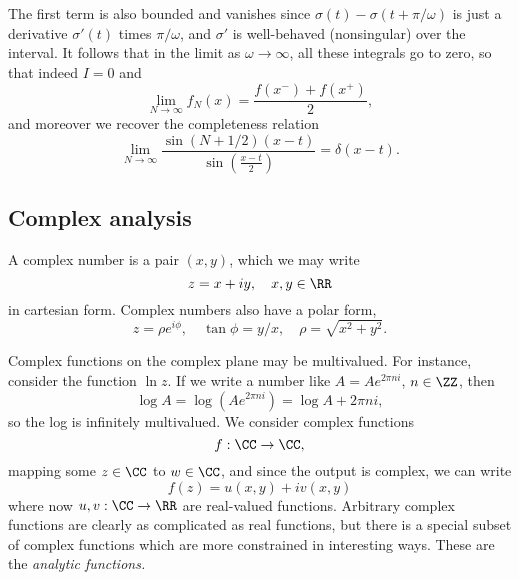 The first term is also bounded and vanishes since $\sigma(t) -\sigma(t+\pi/\omega)$ is just a derivative $\sigma'(t)$ times $\pi/\omega$, and $\sigma'$ is well-behaved (nonsingular) over the interval. It follows that in the limit as $\omega \to \infty$, all these integrals go to zero, so that indeed $I=0$ and
\begin{equation}
    \lim_{N\to \infty} f_N(x) = \frac{f(x^-) + f(x^+)}{2},
\end{equation}
and moreover we recover the completeness relation
\begin{equation}
    \lim_{N\to \infty} \frac{\sin(N+1/2)(x-t)}{\sin(\frac{x-t}{2})} = \delta(x-t).
\end{equation}

\subsection*{Complex analysis}
A complex number is a pair $(x,y)$, which we may write
\begin{equation}
    z = x+iy, \quad x,y\in \RR
\end{equation}
in cartesian form. Complex numbers also have a polar form,
\begin{equation}
    z = \rho e^{i\phi}, \quad \tan \phi =y/x, \quad \rho = \sqrt{x^2+y^2}.
\end{equation}

Complex functions on the complex plane may be multivalued. For instance, consider the function $\ln z$. If we write a number like $A = Ae^{2\pi n i}$, $n\in\ZZ$, then
\begin{equation}
    \log A = \log (Ae^{2\pi n i}) = \log A + 2\pi n i,
\end{equation}
so the log is infinitely multivalued. We consider complex functions
\begin{equation}
    f: \CC \to \CC,
\end{equation}
mapping some $z \in \CC$ to $w\in \CC$, and since the output is complex, we can write
\begin{equation}
    f(z) = u(x,y) + i v(x,y)
\end{equation}
where now $u,v: \CC \to \RR$ are real-valued functions. Arbitrary complex functions are clearly as complicated as real functions, but there is a special subset of complex functions which are more constrained in interesting ways. These are the \emph{analytic functions.}